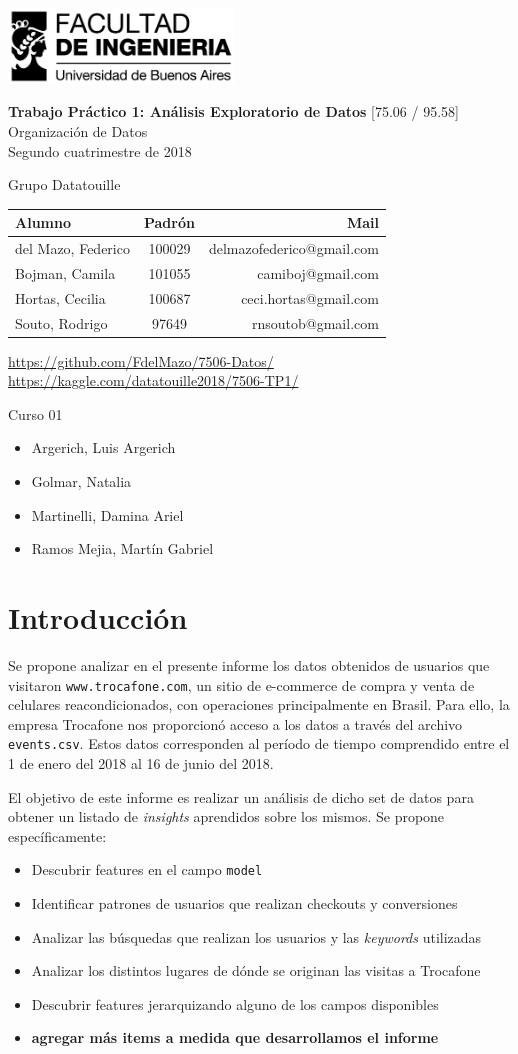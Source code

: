 \documentclass[a4paper]{article}
\makeatletter
\newcommand{\materia}{[75.06 / 95.58] Organización de Datos}
\newcommand{\trabajo}{Trabajo Práctico 1: Análisis Exploratorio de Datos}
\newcommand{\cuatrimestre}{Segundo cuatrimestre de 2018}
\newcommand{\grupo}{Grupo Datatouille}
\newcommand{\repo}{https://github.com/FdelMazo/7506-Datos/}
\newcommand{\kernel}{https://kaggle.com/datatouille2018/7506-TP1/}
\newcommand{\alumnos}{
    del Mazo, Federico & 100029 & delmazofederico@gmail.com\\
    Bojman, Camila & 101055 &  camiboj@gmail.com\\
    Hortas, Cecilia & 100687 & ceci.hortas@gmail.com\\
    Souto, Rodrigo & 97649 & rnsoutob@gmail.com\\
}
\newcommand{\curso}{Curso 01}
\newcommand{\docentes}{
    \item Argerich, Luis Argerich
    \item Golmar, Natalia
    \item Martinelli, Damina Ariel
    \item Ramos Mejia, Martín Gabriel
}
\makeatother
\begin{document}

\begin{titlepage}
	\hfill\includegraphics[width=6cm]{fiuba.jpg}
    \begin{center}
    \vfill
    \Huge \textbf{\trabajo}
    \vskip2cm
    \Large \materia\\
    \cuatrimestre
    \vfill
    \begin{flushleft} 
    \grupo
    \end{flushleft}
    \begin{tabular}{|l|c|r|}
	\hline
	Alumno & Padrón & Mail\\
	\hline \hline
    \alumnos
	\hline
	\end{tabular}
    \begin{flushleft} 
    \url{\repo} \\
    \url{\kernel}
    \end{flushleft}
    \vskip1cm
    \end{center}
    \curso
    \begin{itemize}
        \docentes
    \end{itemize}
\end{titlepage}
\tableofcontents
\newpage
{}
\setcounter{page}{1}

\section{Introducción}

Se propone analizar en el presente informe los datos obtenidos de usuarios que visitaron \texttt{www.trocafone.com}, un sitio de e-commerce de compra y venta de celulares reacondicionados, con operaciones principalmente en Brasil. Para ello, la empresa Trocafone nos proporcionó acceso a los datos a través del archivo \texttt{events.csv}. Estos datos corresponden al período de tiempo comprendido entre el 1 de enero del 2018 al 16 de junio del 2018.

El objetivo de este informe es realizar un análisis de dicho set de datos para obtener un listado de \textit{insights} aprendidos sobre los mismos. Se propone específicamente:
 
 \begin{itemize}
	 \item Descubrir features en el campo \texttt{model}
	 \item Identificar patrones de usuarios que realizan checkouts y conversiones
	 \item Analizar las búsquedas que realizan los usuarios y las \textit{keywords} utilizadas
	 \item Analizar los distintos lugares de dónde se originan las visitas a Trocafone
	 \item Descubrir features jerarquizando alguno de los campos disponibles
	 \item \textbf{agregar más items a medida que desarrollamos el informe}
\end{itemize}
\end{document}
